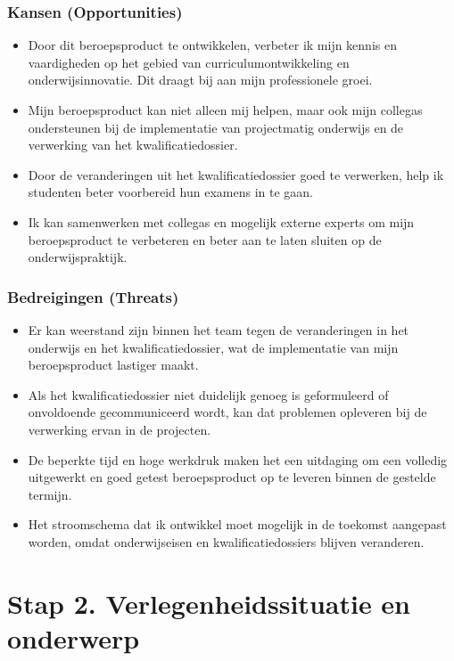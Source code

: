 \subsubsection{Kansen (Opportunities)}
\begin{itemize}
    \item Door dit beroepsproduct te ontwikkelen, verbeter ik mijn kennis en vaardigheden op het gebied van curriculumontwikkeling en onderwijsinnovatie. Dit draagt bij aan mijn professionele groei.
    \item Mijn beroepsproduct kan niet alleen mij helpen, maar ook mijn collega\textquotesingle s
 ondersteunen bij de implementatie van projectmatig onderwijs en de verwerking van het kwalificatiedossier.
    \item Door de veranderingen uit het kwalificatiedossier goed te verwerken, help ik studenten beter voorbereid hun examens in te gaan.
    \item Ik kan samenwerken met collega\textquotesingle s
 en mogelijk externe experts om mijn beroepsproduct te verbeteren en beter aan te laten sluiten op de onderwijspraktijk.
\end{itemize}


\subsubsection{Bedreigingen (Threats)}
\begin{itemize}
    \item Er kan weerstand zijn binnen het team tegen de veranderingen in het onderwijs en het kwalificatiedossier, wat de implementatie van mijn beroepsproduct lastiger maakt.
    \item Als het kwalificatiedossier niet duidelijk genoeg is geformuleerd of onvoldoende gecommuniceerd wordt, kan dat problemen opleveren bij de verwerking ervan in de projecten.
    \item De beperkte tijd en hoge werkdruk maken het een uitdaging om een volledig uitgewerkt en goed getest beroepsproduct op te leveren binnen de gestelde termijn.
    \item Het stroomschema dat ik ontwikkel moet mogelijk in de toekomst aangepast worden, omdat onderwijseisen en kwalificatiedossiers blijven veranderen.
\end{itemize}

\section{Stap 2. Verlegenheidssituatie en onderwerp}

